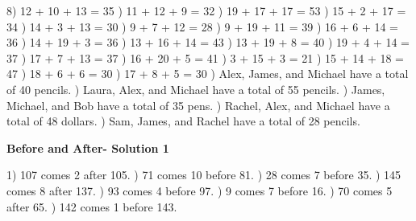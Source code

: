 \documentclass{article}%
\begin{document}
8) 12 + 10 + 13 = 35%
) 11 + 12 + 9 = 32%
) 19 + 17 + 17 = 53%
) 15 + 2 + 17 = 34%
) 14 + 3 + 13 = 30%
) 9 + 7 + 12 = 28%
) 9 + 19 + 11 = 39%
) 16 + 6 + 14 = 36%
) 14 + 19 + 3 = 36%
) 13 + 16 + 14 = 43%
) 13 + 19 + 8 = 40%
) 19 + 4 + 14 = 37%
) 17 + 7 + 13 = 37%
) 16 + 20 + 5 = 41%
) 3 + 15 + 3 = 21%
) 15 + 14 + 18 = 47%
) 18 + 6 + 6 = 30%
) 17 + 8 + 5 = 30%
) Alex, James, and Michael have a total of 40 pencils.%
) Laura, Alex, and Michael have a total of 55 pencils.%
) James, Michael, and Bob have a total of 35 pens.%
) Rachel, Alex, and Michael have a total of 48 dollars.%
) Sam, James, and Rachel have a total of 28 pencils.%
\newline%
\newpage%
\large%
\begin{center}%
\textbf{Before and After- Solution 1}%
\newline%
\end{center} \normalsize%
1) 107 comes 2 after 105.%
) 71 comes 10 before 81.%
) 28 comes 7 before 35.%
) 145 comes 8 after 137.%
) 93 comes 4 before 97.%
) 9 comes 7 before 16.%
) 70 comes 5 after 65.%
) 142 comes 1 before 143.%
\end{document}
